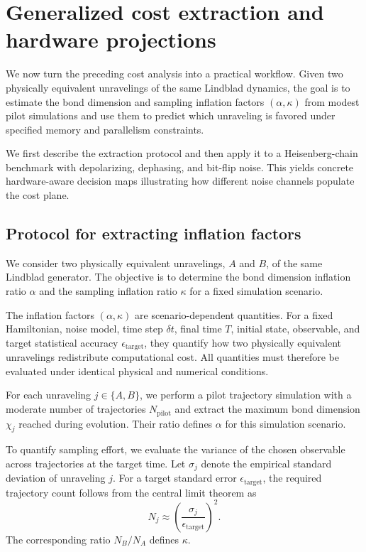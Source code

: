 \documentclass[aps, pra, superscriptaddress, reprint, floatfix]{revtex4-2}
\theoremstyle{plain}
\begin{document}
\section{Generalized cost extraction and hardware projections}
\label{sec:generalized_framework}

We now turn the preceding cost analysis into a practical workflow. Given two physically equivalent unravelings of the same Lindblad dynamics, the goal is to estimate the bond dimension and sampling inflation factors $(\alpha,\kappa)$ from modest pilot simulations and use them to predict which unraveling is favored under specified memory and parallelism constraints.

We first describe the extraction protocol and then apply it to a Heisenberg-chain benchmark with depolarizing, dephasing, and bit-flip noise. This yields concrete hardware-aware decision maps illustrating how different noise channels populate the cost plane.

\subsection{Protocol for extracting inflation factors}
\label{sec:extraction_protocol}
We consider two physically equivalent unravelings, $A$ and $B$, of the same Lindblad generator. The objective is to determine the bond dimension inflation ratio $\alpha$ and the sampling inflation ratio $\kappa$ for a fixed simulation scenario.

The inflation factors $(\alpha,\kappa)$ are scenario-dependent quantities. 
For a fixed Hamiltonian, noise model, time step $\delta t$, final time $T$, initial state, observable, and target statistical accuracy $\epsilon_{\mathrm{target}}$, they quantify how two physically equivalent unravelings redistribute computational cost.
All quantities must therefore be evaluated under identical physical and numerical conditions.

For each unraveling $j\in\{A,B\}$, we perform a pilot trajectory simulation with a moderate number of trajectories $N_{\mathrm{pilot}}$ and extract the maximum bond dimension $\chi_j$ reached during evolution. Their ratio defines $\alpha$ for this simulation scenario.

To quantify sampling effort, we evaluate the variance of the chosen observable across trajectories at the target time. 
Let $\sigma_j$ denote the empirical standard deviation of unraveling $j$. 
For a target standard error $\epsilon_{\mathrm{target}}$, the required trajectory count follows from the central limit theorem as
\begin{equation}
N_j \approx \left(\frac{\sigma_j}{\epsilon_{\mathrm{target}}}\right)^2.
\end{equation} 
The corresponding ratio $N_B/N_A$ defines $\kappa$.
\end{document}
